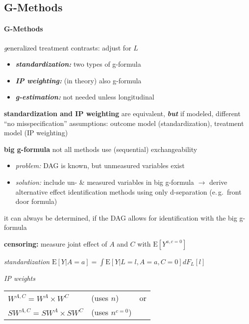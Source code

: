 \documentclass[8pt,twoside]{extarticle}
\begin{document}
\subsection{G-Methods}
\begin{multicols}{2}


\paragraph{G-Methods} \textit{g}eneralized treatment contrasts:
adjust for $L$
\begin{itemize}[itemsep=0em, topsep=0pt, partopsep=0pt,parsep=0pt]
\setlength{\itemsep}{0pt}%
\setlength{\parskip}{0pt}
\item \textbf{\textit{standardization:}}  two types of g-formula
\item \textbf{\textit{IP weighting:}} (in theory) also g-formula 
\item \textbf{\textit{g-estimation:}} not needed unless longitudinal
\end{itemize}

\noindent \textbf{standardization and IP weighting}
are equivalent, \textit{\textbf{but}} if modeled, different ``no misspecification'' assumptions: outcome model (standardization), treatment model (IP weighting)

\noindent \textbf{big g-formula}
not all methods use (sequential) exchangeability 
\begin{itemize}[itemsep=0em, topsep=0pt, partopsep=0pt,parsep=0pt]
\item \textit{problem:} DAG is known, but unmeasured variables exist
\item \textit{solution:} include un- \& measured variables in big g-formula $\to$ derive
alternative effect identification methods using only d-separation (e.\,g.\  front door formula)
\end{itemize}
it can always be determined, if the DAG allows for identification with the big g-formula
\citep{hernan2023causal}


\noindent \textbf{censoring:} measure joint effect of $A$ and $C$ with
$\mathrm{E}\left[Y^{a, c=0}\right]$

\noindent \textit{standardization} $\mathrm{E}\left[Y|A=a\right] = \int \mathrm{E}\left[Y|L{=}l, A{=}a, C{=}0\right]dF_L\left[l\right]$\vspace{0.2em}

\noindent \textit{IP weights}\vspace{-1.30em}

\hspace{3.5em}\begin{tabular}{l l l}
$W^{A,C}=W^A \times W^C$  &(uses $n$) & or \\
$SW^{A,C}=SW^A \times SW^C$ &(uses $n^{c=0}$) & 
\end{tabular}\vspace{0.3em}


\end{multicols}
\end{document}
